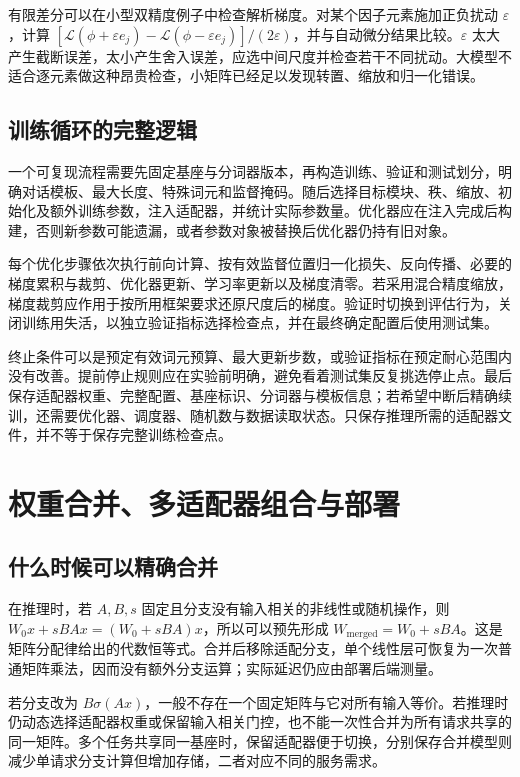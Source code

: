\documentclass[UTF8,12pt,a4paper,fontset=fandol]{ctexart}
\begin{document}
有限差分可以在小型双精度例子中检查解析梯度。对某个因子元素施加正负扰动 $\varepsilon$，计算
$[\mathcal L(\phi+\varepsilon e_j)-\mathcal L(\phi-\varepsilon e_j)]/(2\varepsilon)$，并与自动微分结果比较。$\varepsilon$ 太大产生截断误差，太小产生舍入误差，应选中间尺度并检查若干不同扰动。大模型不适合逐元素做这种昂贵检查，小矩阵已经足以发现转置、缩放和归一化错误。

\subsection{训练循环的完整逻辑}

一个可复现流程需要先固定基座与分词器版本，再构造训练、验证和测试划分，明确对话模板、最大长度、特殊词元和监督掩码。随后选择目标模块、秩、缩放、初始化及额外训练参数，注入适配器，并统计实际参数量。优化器应在注入完成后构建，否则新参数可能遗漏，或者参数对象被替换后优化器仍持有旧对象。

每个优化步骤依次执行前向计算、按有效监督位置归一化损失、反向传播、必要的梯度累积与裁剪、优化器更新、学习率更新以及梯度清零。若采用混合精度缩放，梯度裁剪应作用于按所用框架要求还原尺度后的梯度。验证时切换到评估行为，关闭训练用失活，以独立验证指标选择检查点，并在最终确定配置后使用测试集。

终止条件可以是预定有效词元预算、最大更新步数，或验证指标在预定耐心范围内没有改善。提前停止规则应在实验前明确，避免看着测试集反复挑选停止点。最后保存适配器权重、完整配置、基座标识、分词器与模板信息；若希望中断后精确续训，还需要优化器、调度器、随机数与数据读取状态。只保存推理所需的适配器文件，并不等于保存完整训练检查点。

\section{权重合并、多适配器组合与部署}
\label{sec:merging}

\subsection{什么时候可以精确合并}

在推理时，若 $A,B,s$ 固定且分支没有输入相关的非线性或随机操作，则
$W_0x+sBAx=(W_0+sBA)x$，所以可以预先形成
$W_{\mathrm{merged}}=W_0+sBA$。这是矩阵分配律给出的代数恒等式。合并后移除适配分支，单个线性层可恢复为一次普通矩阵乘法，因而没有额外分支运算；实际延迟仍应由部署后端测量。

若分支改为 $B\sigma(Ax)$，一般不存在一个固定矩阵与它对所有输入等价。若推理时仍动态选择适配器权重或保留输入相关门控，也不能一次性合并为所有请求共享的同一矩阵。多个任务共享同一基座时，保留适配器便于切换，分别保存合并模型则减少单请求分支计算但增加存储，二者对应不同的服务需求。
\end{document}
